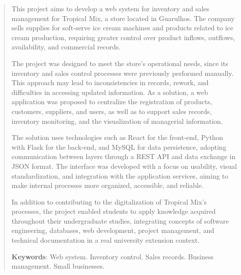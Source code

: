 \begin{abstract}

This project aims to develop a web system for inventory and sales management for Tropical Mix, a store located in Guarulhos. The company sells supplies for soft-serve ice cream machines and products related to ice cream production, requiring greater control over product inflows, outflows, availability, and commercial records.

The project was designed to meet the store's operational needs, since its inventory and sales control processes were previously performed manually. This approach may lead to inconsistencies in records, rework, and difficulties in accessing updated information. As a solution, a web application was proposed to centralize the registration of products, customers, suppliers, and users, as well as to support sales records, inventory monitoring, and the visualization of managerial information.

The solution uses technologies such as React for the front-end, Python with Flask for the back-end, and MySQL for data persistence, adopting communication between layers through a REST API and data exchange in JSON format. The interface was developed with a focus on usability, visual standardization, and integration with the application services, aiming to make internal processes more organized, accessible, and reliable.

In addition to contributing to the digitalization of Tropical Mix's processes, the project enabled students to apply knowledge acquired throughout their undergraduate studies, integrating concepts of software engineering, databases, web development, project management, and technical documentation in a real university extension context.

\textbf{Keywords}: Web system. Inventory control. Sales records. Business management. Small businesses.

\end{abstract}
